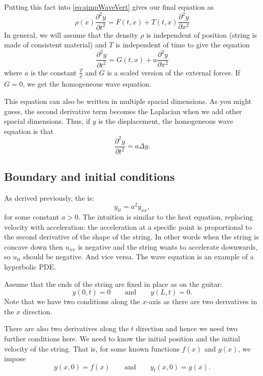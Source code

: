 \documentclass{ximera}
\begin{document}
Putting this fact into \eqref{eq:simpWaveVert} gives our final equation as
\[ 
    \rho(x) \frac{\partial^2 y}{\partial t^2} = F(t,x) + T(t, x)\frac{\partial^2 y}{\partial x^2}
\]
In general, we will assume that the density $\rho$ is independent of position (string is made of consistent material) and $T$ is independent of time to give the equation
\begin{equation}
    \frac{\partial^2 y}{\partial t^2} = G(t,x) + a \frac{\partial^2 y}{\partial x^2}
    \label{eq:WaveNonHomog}
\end{equation}
where $a$ is the constant $\frac{T}{\rho}$ and $G$ is a scaled version of the external forces. If $G = 0$, we get the homogeneous wave equation. 

This equation can also be written in multiple spacial dimensions. As you might guess, the second derivative term becomes the Laplacian when we add other spacial dimensions. Thus, if $y$ is the displacement, the homogeneous wave equation is that
\[ 
    \frac{\partial^2 y}{\partial t^2} = a \Delta y. 
\]

\subsection{Boundary and initial conditions} 

As derived previously, the \emph{} is:
\begin{equation*}
    y_{tt} = a^2 y_{xx} ,
\end{equation*}
for some constant $a > 0$. The intuition is similar to the heat equation, replacing velocity with acceleration: the acceleration at a specific point is proportional to the second derivative of the shape of the string.  In other words when the string is concave down then $u_{xx}$ is negative and the string wants to accelerate downwards, so $u_{tt}$ should be negative.  And vice versa. The wave equation is an example of a hyperbolic PDE.

Assume that the ends of the string are fixed in place as on the guitar:
\begin{equation*}
    y(0,t) = 0 \qquad \text{and} \qquad y(L,t) = 0.
\end{equation*}
Note that we have two conditions along the $x$-axis as there are two derivatives in the $x$ direction.

There are also two derivatives along the $t$ direction and hence we need two further conditions here.  We need to know the initial position and the initial velocity of the string.  That is, for some known functions $f(x)$ and $g(x)$, we impose
\begin{equation*}
    y(x,0) = f(x)  \qquad \text{and} \qquad y_t (x,0) = g(x) .
\end{equation*}
\end{document}
